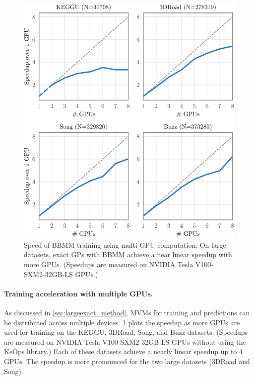 \begin{figure}[t!]
  \centering
  \includegraphics[width=0.70\linewidth]{figures/gpu_speedup.pdf}
  \caption[Speed of BBMM training using multi-GPU computation.]{
    Speed of BBMM training using multi-GPU computation.
    On large datasets, exact GPs with BBMM achieve a near linear speedup with more GPUs.
    (Speedups are measured on NVIDIA Tesla V100-SXM2-32GB-LS GPUs.)
  }
  \label{fig:gpu_speedup}
\end{figure}

\paragraph{Training acceleration with multiple GPUs.}
As discussed in \cref{sec:largeexact_method}, MVMs for training and predictions can be distributed across multiple devices.
\cref{fig:gpu_speedup} plots the speedup as more GPUs are used for training on the KEGGU, 3DRoad, Song, and Buzz datasets.
(Speedups are measured on NVIDIA Tesla V100-SXM2-32GB-LS GPUs without using the KeOps library.)
Each of these datasets achieve a nearly linear speedup up to 4 GPUs.
The speedup is more pronounced for the two large datasets (3DRoad and Song).

